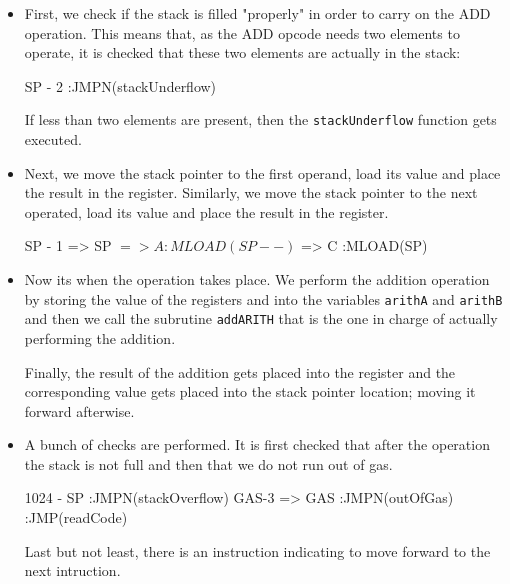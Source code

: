 \begin{itemize}

\item First, we check if the stack is filled "properly" in order to carry on the ADD operation. This means that, as the ADD opcode needs two elements to operate, it is checked that these two elements are actually in the stack:

\begin{zkasm}
SP - 2          :JMPN(stackUnderflow)
\end{zkasm}

If less than two elements are present, then the \texttt{stackUnderflow} function gets executed.

\item Next, we move the stack pointer to the first operand, load its value and place the result in the \A register. Similarly, we move the stack pointer to the next operated, load its value and place the result in the \C register.

\begin{zkasm}
SP - 1 => SP
$ => A          :MLOAD(SP--)
$ => C          :MLOAD(SP)
\end{zkasm}

\item Now its when the operation takes place. We perform the addition operation by storing the value of the registers \A and \C into the variables \texttt{arithA} and \texttt{arithB} and then we call the subrutine \texttt{addARITH} that is the one in charge of actually performing the addition.


Finally, the result of the addition gets placed into the register \E and the corresponding value gets placed into the stack pointer location; moving it forward afterwise.


\item A bunch of checks are performed. It is first checked that after the operation the stack is not full and then that we do not run out of gas.

\begin{zkasm}
1024 - SP       :JMPN(stackOverflow)
GAS-3 => GAS    :JMPN(outOfGas)
:JMP(readCode)
\end{zkasm}

Last but not least, there is an instruction indicating to move forward to the next intruction.

\end{itemize}






